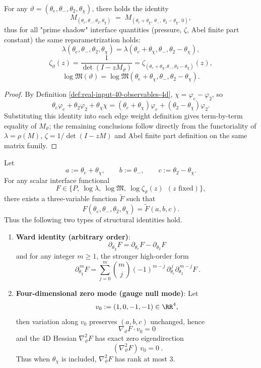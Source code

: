 \begin{proposition}\label{prop:chi-reparam-4d}
For any $\vartheta=(\theta_e,\theta_-,\theta_2,\theta_\chi)$, there holds the identity
\[
M_{(\theta_e,\theta_-,\theta_2,\theta_\chi)}\;=\;M_{(\theta_e+\theta_\chi,\ \theta_-,\ \theta_2-\theta_\chi,\ 0)},
\]
thus for all "prime shadow" interface quantities (pressure, $\zeta$, Abel finite part constant) the same reparametrization holds:
\[
\lambda(\theta_e,\theta_-,\theta_2,\theta_\chi)=\lambda(\theta_e+\theta_\chi,\theta_-,\theta_2-\theta_\chi),
\]
\[
\zeta_{\vartheta}(z)=\frac{1}{\det(I-zM_\vartheta)}=\zeta_{(\theta_e+\theta_\chi,\theta_-,\theta_2-\theta_\chi)}(z),
\]
\[
\log\mathfrak{M}(\vartheta)=\log\mathfrak{M}(\theta_e+\theta_\chi,\theta_-,\theta_2-\theta_\chi).
\]
\end{proposition}

\begin{proof}
By Definition \ref{def:real-input-40-observables-4d}, $\chi=\varphi_e-\varphi_2$, so
\[
\theta_e\varphi_e+\theta_2\varphi_2+\theta_\chi\chi
=(\theta_e+\theta_\chi)\varphi_e+(\theta_2-\theta_\chi)\varphi_2.
\]
Substituting this identity into each edge weight definition gives term-by-term equality of $M_\vartheta$; the remaining conclusions follow directly from the functoriality of $\lambda=\rho(M)$, $\zeta=1/\det(I-zM)$ and Abel finite part definition on the same matrix family.
\end{proof}

\begin{corollary}\label{cor:chi-gauge-ward-nullmode}
Let
$$
a:=\theta_e+\theta_\chi,\qquad b:=\theta_-,\qquad c:=\theta_2-\theta_\chi.
$$
For any scalar interface functional
$$
F\in\{P,\ \log\lambda,\ \log\mathfrak{M},\ \log\zeta_\vartheta(z)\ \ (\text{$z$ fixed})\},
$$
there exists a three-variable function \(\widetilde F\) such that
$$
F(\theta_e,\theta_-,\theta_2,\theta_\chi)=\widetilde F(a,b,c).
$$
Thus the following two types of structural identities hold.
\begin{enumerate}
  \item \textbf{Ward identity (arbitrary order)}:
  $$
  \boxed{\ \partial_{\theta_\chi}F=\partial_{\theta_e}F-\partial_{\theta_2}F\ }
  $$
  and for any integer \(m\ge 1\), the stronger high-order form
  $$
  \boxed{\ \partial_{\theta_\chi}^{\,m}F
  =\sum_{j=0}^{m}\binom{m}{j}(-1)^{m-j}\,
  \partial_{\theta_e}^{\,j}\partial_{\theta_2}^{\,m-j}F\ }.
  $$
  \item \textbf{Four-dimensional zero mode (gauge null mode)}: Let
  $$
  v_0:=(1,0,-1,-1)\in\RR^4,
  $$
  then variation along \(v_0\) preserves \((a,b,c)\) unchanged, hence
  $$
  \boxed{\ \nabla_\vartheta F\cdot v_0=0\ }
  $$
  and the 4D Hessian \( \nabla_\vartheta^2F \) has exact zero eigendirection
  $$
  \boxed{\ (\nabla_\vartheta^2F)\,v_0=0\ }.
  $$
  Thus when \(\theta_\chi\) is included, \(\nabla_\vartheta^2F\) has rank at most \(3\).
\end{enumerate}
\end{corollary}


